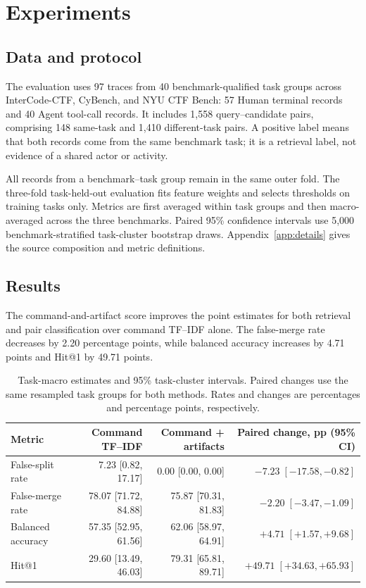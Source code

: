 \section{Experiments}
\label{sec:experiments}

\subsection{Data and protocol}

The evaluation uses 97 traces from 40 benchmark-qualified task groups across InterCode-CTF, CyBench, and NYU CTF Bench: 57 Human terminal records and 40 Agent tool-call records. It includes 1,558 query--candidate pairs, comprising 148 same-task and 1,410 different-task pairs. A positive label means that both records come from the same benchmark task; it is a retrieval label, not evidence of a shared actor or activity.

All records from a benchmark--task group remain in the same outer fold. The three-fold task-held-out evaluation fits feature weights and selects thresholds on training tasks only. Metrics are first averaged within task groups and then macro-averaged across the three benchmarks. Paired 95\% confidence intervals use 5,000 benchmark-stratified task-cluster bootstrap draws. Appendix~\ref{app:details} gives the source composition and metric definitions.

\subsection{Results}

The command-and-artifact score improves the point estimates for both retrieval and pair classification over command TF--IDF alone. The false-merge rate decreases by 2.20 percentage points, while balanced accuracy increases by 4.71 points and Hit@1 by 49.71 points.

\begin{table}[t]
\centering
\small
\setlength{\tabcolsep}{4pt}
\renewcommand{\arraystretch}{1.14}
\begin{tabularx}{\linewidth}{>{\raggedright\arraybackslash}Xrrr}
\toprule
Metric & Command TF--IDF & Command + artifacts & Paired change, pp (95\% CI) \\
\midrule
False-split rate & 7.23 [0.82, 17.17] & 0.00 [0.00, 0.00] & $-7.23\;[-17.58,-0.82]$ \\
False-merge rate & 78.07 [71.72, 84.88] & 75.87 [70.31, 81.83] & $-2.20\;[-3.47,-1.09]$ \\
Balanced accuracy & 57.35 [52.95, 61.56] & 62.06 [58.97, 64.91] & $+4.71\;[+1.57,+9.68]$ \\
Hit@1 & 29.60 [13.49, 46.03] & 79.31 [65.81, 89.71] & $+49.71\;[+34.63,+65.93]$ \\
\bottomrule
\end{tabularx}
\caption{Task-macro estimates and 95\% task-cluster intervals. Paired changes use the same resampled task groups for both methods. Rates and changes are percentages and percentage points, respectively.}
\label{tab:pairwise-association-results}
\end{table}

